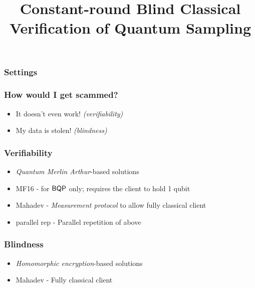 \documentclass{beamer}
\title{Constant-round Blind Classical Verification of Quantum Sampling}
\begin{document}
\begin{frame}
	\titlepage
\end{frame}

\begin{frame}
	\frametitle{Settings}


	\begin{flushright}
	\end{flushright}
\end{frame}

\begin{frame}
	\frametitle{How would I get scammed?}
	\pause
	\begin{itemize}[<+->]
		\item It doesn't even work! \emph{(verifiability)}
		\item My data is stolen! \emph{(blindness)}
	\end{itemize}
\end{frame}

\begin{frame}
	\frametitle{Verifiability}
	\begin{itemize}[<+->]
		\item \emph{Quantum Merlin Arthur}-based solutions
		\item MF16 - for $\operatorname{\mathsf{BQP}}$ only; requires the client to hold 1 qubit
		\item Mahadev - \emph{Measurement protocol} to allow fully classical client
		\item parallel rep - Parallel repetition of above
	\end{itemize}
\end{frame}

\begin{frame}
	\frametitle{Blindness}
	\begin{itemize}[<+->]
		\item \emph{Homomorphic encryption}-based solutions
		\item Mahadev - Fully classical client
	\end{itemize}
\end{frame}
\end{document}
